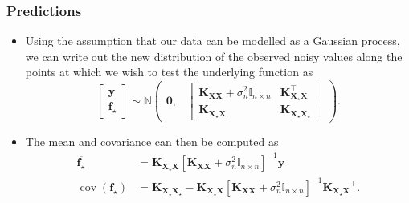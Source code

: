 \documentclass[9pt,hyperref={pdfpagelabels=false},xcolor=table]{beamer}
\begin{document}
\begin{frame}
    \frametitle{Predictions}
    \begin{itemize}
        \item Using the assumption that our data can be modelled as a Gaussian process, we can write out the new distribution of the observed noisy values along the points at which we wish to test the underlying function as
              \[
                  \begin{bmatrix}
                      \bm{y} \\
                      \bm{f}_{\star}
                  \end{bmatrix}
                  \sim \mathbb{N}
                  \begin{pmatrix}
                      \bm{0}, &
                      {
                              \begin{bmatrix}
                                  \bm{K_{XX}} + \sigma_n^2 \mathbb{I}_{n \times n} & \bm{K_{X_{\star}X}^{\intercal}} \\
                                  \bm{K_{X_{\star}X}}                              & \bm{K_{X_{\star}X_{\star}}}
                              \end{bmatrix}
                          }
                  \end{pmatrix}.
              \]
              \pause
        \item The mean and covariance can then be computed as
              \begin{align*}
                  \overline{\bm{f}_{\star}}           & = \bm{K_{X_{\star}X}} \left[ \bm{K_{XX}} + \sigma_n^2 \mathbb{I}_{n \times n} \right]^{-1} \bm{y}                                                         \\
                  \operatorname{cov} (\bm{f}_{\star}) & = \bm{K_{X_{\star}X_{\star}}} - \bm{K_{X_{\star}X}} \left[ \bm{K_{XX}} + \sigma_n^2 \mathbb{I}_{n \times n} \right]^{-1} \bm{K_{X_{\star}X}}^{\intercal}.
              \end{align*}
    \end{itemize}
\end{frame}
\end{document}
